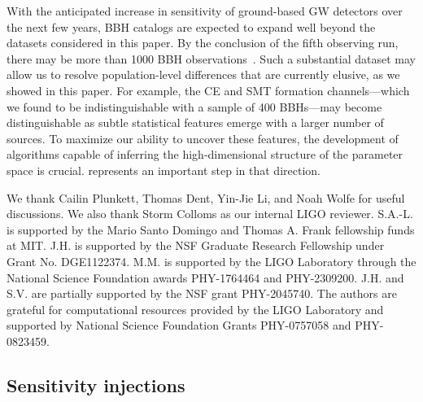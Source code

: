 \begin{refsection}
With the anticipated increase in sensitivity of ground-based \ac{GW} detectors over the next few years, \ac{BBH} catalogs are expected to expand well beyond the datasets considered in this paper. By the conclusion of the fifth observing run, there may be more than 1000 \ac{BBH} observations~\citep{Kiendrebeogo:2023hzf}. Such a substantial dataset may allow us to resolve population-level differences that are currently elusive, as we showed in this paper. For example, the \ac{CE} and \ac{SMT} formation channels---which we found to be indistinguishable with a sample of 400 \acp{BBH}---may become distinguishable as subtle statistical features emerge with a larger number of sources. To maximize our ability to uncover these features, the development of algorithms capable of inferring the high-dimensional structure of the parameter space is crucial. \PixelPop represents an important step in that direction.

\begin{acknowledgments}
We thank Cailin Plunkett, Thomas Dent, Yin-Jie Li, and Noah Wolfe for useful discussions. We also thank Storm Colloms as our internal LIGO reviewer.
%
S.A.-L. is supported by the Mario Santo Domingo and Thomas A. Frank fellowship funds at MIT.
%
J.H. is supported by the NSF Graduate Research Fellowship under Grant No. DGE1122374.
%
M.M. is supported by the LIGO Laboratory through the National Science Foundation awards PHY-1764464 and PHY-2309200.
%
J.H. and S.V. are partially supported by the NSF grant PHY-2045740.
%
The authors are grateful for computational resources provided by the LIGO Laboratory and supported by National Science Foundation Grants PHY-0757058 and PHY-0823459.
\end{acknowledgments}


\begin{subappendices}
\section{Sensitivity injections}\label{app:vtInjs}


\end{subappendices}
\end{refsection}
